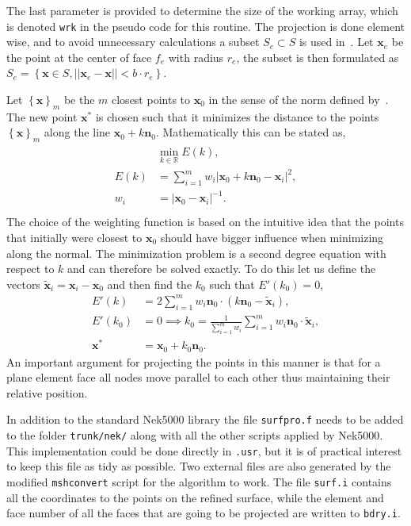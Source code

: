 The last parameter is provided to determine the size of the working array,
which is denoted \verb|wrk| in the pseudo code for this routine. 
The projection is done element wise, and to avoid unnecessary calculations a subset $S_e \subset S$
is used in~.
Let $\mathbf{x}_e$ be the point at the center of face $f_e$
with radius $r_e$, the subset is then formulated as  
$S_e = \left\{ \mathbf{x} \in S , ||\mathbf{x}_e-\mathbf{x}|| < b \cdot r_e \right\}$.

Let $\left\{ \mathbf{x} \right\}_m$ be the $m$ closest points to $\mathbf{x}_0$ in the sense of the norm
defined by~. The new point $\mathbf{x}^*$ is chosen such that it minimizes the distance 
to the points $\left\{ \mathbf{x} \right\}_m$ along the line $\mathbf{x}_0+k\mathbf{n}_0$. Mathematically this can be stated as, 
\begin{align}
    \begin{split}
    &\min_{k\in \mathbb{R}} E(k), \\
    E(k) &= \sum_{i=1}^{m}w_i|\mathbf{x}_0+k\mathbf{n}_0-\mathbf{x}_i|^2, \\ 
    w_i &= |\mathbf{x}_0-\mathbf{x}_i|^{-1}. \\
    \end{split}
    \label{eq:minprob}
\end{align}
The choice of the weighting function is based on the intuitive idea that the points that initially 
were closest to $\mathbf{x}_0$ should have bigger influence when minimizing along the normal.
The minimization problem is a second degree equation with respect to $k$ and can therefore be solved exactly. 
To do this let us define the vectors $\mathbf{\tilde x}_i=\mathbf{x}_i-\mathbf{x}_0$ and then find the $k_0$ such that $E'(k_0) = 0$,
%
\begin{align}
    E'(k) &= 2 \sum_{i=1}^m w_i \mathbf{n}_0 \cdot (k \mathbf{n}_0 - \mathbf{\tilde x}_i),\\
    E'(k_0) &= 0 \implies k_0 = \frac{1}{\sum_{i=1}^m w_i}\sum_{i=1}^m w_i \mathbf{n}_0 \cdot \mathbf{\tilde x}_i,\\
    \mathbf{x}^{*} &= \mathbf{x}_0 + k_0 \mathbf{n}_0.
    \label{eq:minimizing}
\end{align}
%
An important argument for projecting the points in this manner is that for a plane element face all nodes move parallel
to each other thus maintaining their relative position.

In addition to the standard Nek5000 library the file \verb|surfpro.f| needs to be added to 
the folder \verb|trunk/nek/| along with all the other scripts applied by Nek5000.
This implementation could be done directly in \verb|.usr|, but it is of practical 
interest to keep this file as tidy as possible.
Two external files are also generated by the modified \verb|mshconvert| script for the algorithm to work.
The file \verb|surf.i| contains all the coordinates to the points on the refined surface, while 
the element and face number of all the faces that are going to be projected are written to \verb|bdry.i|. 

